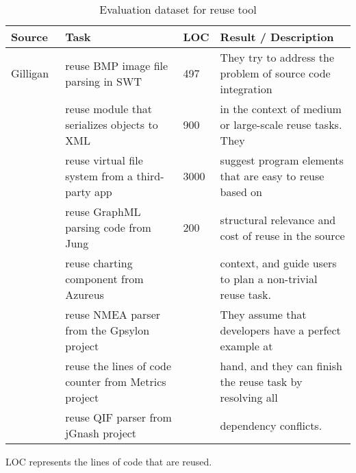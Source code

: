 \begin{table*}[ht]
\begin{center}
\caption{Evaluation dataset for reuse tool }
\label{tab:total}
\vspace{1mm}
\scriptsize{
\begin{tabular*}{1\textwidth}{@{}l|l|l|l@{}} \hline
Source&Task&LOC&Result / Description\\\hline
Gilligan~\cite{Holmes:reuse07}&reuse BMP image file parsing in SWT&497&They try to address the problem of source code integration \\
&reuse  module that serializes objects to XML&900& in the context of medium or large-scale reuse tasks. They  \\
&reuse virtual file system from a third-party app&3000& suggest program elements that are easy to reuse based on \\
&reuse GraphML parsing code from Jung&200& structural  relevance and cost of reuse in the source  \\ 
&reuse charting component from Azureus&& context,  and guide  users to  plan a non-trivial reuse task.  \\
&reuse NMEA parser from the Gpsylon project&&They assume that developers have a perfect example at \\
&reuse the lines of code counter from Metrics project&&hand,  and they can finish the reuse task by resolving all\\
&reuse QIF parser from jGnash project&& dependency conflicts.\\ \hline

\end{tabular*}
 \label{tab:reuse}

LOC represents the lines of code that are reused.

}
 \end{center}
\end{table*}



